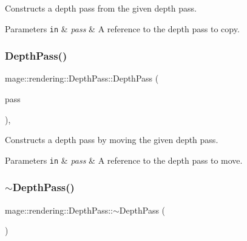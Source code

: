 Constructs a depth pass from the given depth pass.


\begin{DoxyParams}[1]{Parameters}
\mbox{\tt in}  & {\em pass} & A reference to the depth pass to copy. \\
\hline
\end{DoxyParams}
\mbox{\label{classmage_1_1rendering_1_1_depth_pass_a7157b0a6480a1fca6001e4eb93b4e5fd}} 
\subsubsection{\texorpdfstring{Depth\+Pass()}{DepthPass()}\hspace{0.1cm}{\footnotesize\ttfamily [3/3]}}
{\footnotesize\ttfamily mage\+::rendering\+::\+Depth\+Pass\+::\+Depth\+Pass (\begin{DoxyParamCaption}\item[{\mbox{\hyperlink{classmage_1_1rendering_1_1_depth_pass}{Depth\+Pass}} \&\&}]{pass }\end{DoxyParamCaption})\hspace{0.3cm}{\ttfamily [default]}, {\ttfamily [noexcept]}}

Constructs a depth pass by moving the given depth pass.


\begin{DoxyParams}[1]{Parameters}
\mbox{\tt in}  & {\em pass} & A reference to the depth pass to move. \\
\hline
\end{DoxyParams}
\mbox{\label{classmage_1_1rendering_1_1_depth_pass_a5ad944e2a8f93e2f4bf5f9f97641e003}} 
\subsubsection{\texorpdfstring{$\sim$\+Depth\+Pass()}{~DepthPass()}}
{\footnotesize\ttfamily mage\+::rendering\+::\+Depth\+Pass\+::$\sim$\+Depth\+Pass (\begin{DoxyParamCaption}{ }\end{DoxyParamCaption})\hspace{0.3cm}{\ttfamily [default]}}

